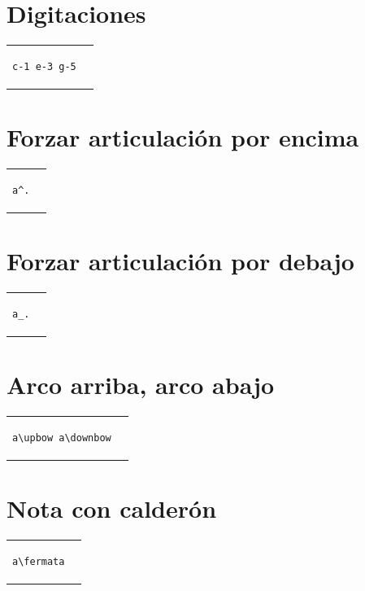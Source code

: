 \documentclass[a4paper,10pt,oneside,headinclude,titlepage]{article} %
\begin{document}
\section*{Digitaciones}
\begin{tabular}{m{2cm}m{2cm}}
\begin{verbatim}
c-1 e-3 g-5
\end{verbatim}
&
\begin[fragment,relative=1,notime]{lilypond}
c-1 e-3 g-5
\end{lilypond}
\end{tabular}

\section*{Forzar articulación por encima}
\begin{tabular}{m{2cm}m{2cm}}
\begin{verbatim}
a^.
\end{verbatim}
&
\begin[fragment,notime]{lilypond}
a^.
\end{lilypond}
\end{tabular}

\section*{Forzar articulación por debajo}
\begin{tabular}{m{2cm}m{2cm}}
\begin{verbatim}
a_.
\end{verbatim}
&
\begin[fragment,notime]{lilypond}
a_.
\end{lilypond}
\end{tabular}

\section*{Arco arriba, arco abajo}
\begin{tabular}{m{3cm}m{2cm}}
\begin{verbatim}
a\upbow a\downbow
\end{verbatim}
&
\begin[fragment,notime]{lilypond}
a\upbow a\downbow
\end{lilypond}
\end{tabular}

\section*{Nota con calderón}
\begin{tabular}{m{3cm}m{2cm}}
\begin{verbatim}
a\fermata
\end{verbatim}
&
\begin[fragment,notime]{lilypond}
a\fermata
\end{lilypond}
\end{tabular}
\end{document}
